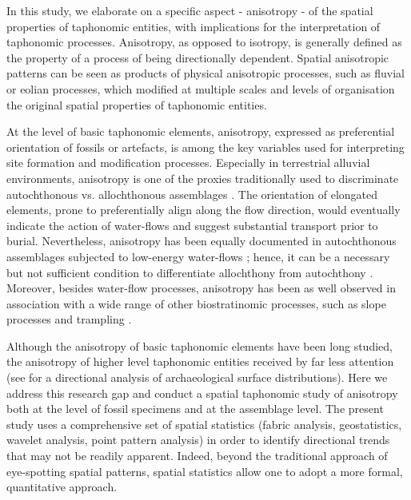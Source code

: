 \documentclass[review,times,authoryear]{elsarticle} %
\begin{document}
In this study, we elaborate on a specific aspect - anisotropy - of the spatial properties of taphonomic entities, with implications for the interpretation of taphonomic processes. Anisotropy, as opposed to isotropy, is generally defined as the property of a process of being directionally dependent. Spatial anisotropic patterns can be seen as products of physical anisotropic processes, such as fluvial or eolian processes, which modified at multiple scales and levels of organisation the original spatial properties of taphonomic entities.

At the level of basic taphonomic elements, anisotropy, expressed as preferential orientation of fossils or artefacts, is among the key variables used for interpreting site formation and modification processes. Especially in terrestrial alluvial environments, anisotropy is one of the proxies traditionally used to discriminate autochthonous vs. allochthonous assemblages \citep[][among others]{Petraglia1987,Petraglia1994,Schick1987a,Toots1965,Voorhies1969}. The orientation of elongated elements, prone to preferentially align along the flow direction, would eventually indicate the action of water-flows and suggest substantial transport prior to burial. Nevertheless, anisotropy has been equally documented in autochthonous assemblages subjected to low-energy water-flows \citep{Cobo-Sanchez2014,Dominguez-Rodrigo2012,Dominguez-Rodrigo2014}; hence, it can be a necessary but not sufficient condition to differentiate allochthony from autochthony \citep{Lenoble2004}. Moreover, besides water-flow processes, anisotropy has been as well observed in association with a wide range of other biostratinomic processes, such as slope processes \citep{Bertran1995} and trampling \citep{Benito-Calvo2011a}.

Although the anisotropy of basic taphonomic elements have been long studied, the anisotropy of higher level taphonomic entities received by far less attention (see \citealp{Markofsky2012} for a directional analysis of archaeological surface distributions). Here we address this research gap and conduct a spatial taphonomic study of anisotropy both at the level of fossil specimens and at the assemblage level. The present study uses a comprehensive set of spatial statistics (fabric analysis, geostatistics, wavelet analysis, point pattern analysis) in order to identify directional trends that may not be readily apparent. Indeed, beyond the traditional approach of eye-spotting spatial patterns, spatial statistics allow one to adopt a more formal, quantitative approach.
\end{document}
